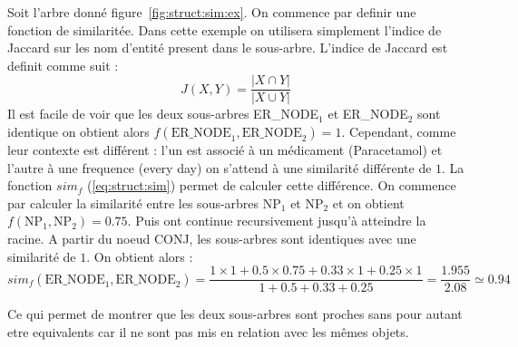 \begin{example}
    Soit l'arbre donné figure~\ref{fig:struct:sim:ex}.
    On commence par definir une fonction de similaritée.
    Dans cette exemple on utilisera simplement l'indice de Jaccard \cite{jaccardDistributionFloreAlpine1901} sur les nom d'entité present dans le sous-arbre.
    L'indice de Jaccard est definit comme suit :
    \[
        J(X, Y) = \frac{\lvert X \cap Y \rvert}{\lvert X \cup Y \rvert}
    \]
    Il est facile de voir que les deux sous-arbres ER\_NODE$_1$ et ER\_NODE$_2$ sont identique on obtient alors $f(\text{ER\_NODE}_1, \text{ER\_NODE}_2) = 1$.
    Cependant, comme leur contexte est différent : l'un est associé à un médicament (Paracetamol) et l'autre à une frequence (every day) on s'attend à une similarité différente de $1$.
    La fonction $sim_f$ (\ref{eq:struct:sim}) permet de calculer cette différence.
    On commence par calculer la similarité entre les sous-arbres NP$_1$ et NP$_2$ et on obtient $f(\text{NP}_1, \text{NP}_2) = 0.75$.
    Puis ont continue recursivement jusqu'à atteindre la racine.
    A partir du noeud CONJ, les sous-arbres sont identiques avec une similarité de $1$.
    On obtient alors :
    \[
        sim_f(\text{ER\_NODE}_1, \text{ER\_NODE}_2) = \frac{1 \times 1 + 0.5 \times 0.75 + 0.33 \times 1 + 0.25 \times 1}{1 + 0.5 + 0.33 + 0.25} = \frac{1.955}{2.08} \simeq 0.94
    \]

    Ce qui permet de montrer que les deux sous-arbres sont proches sans pour autant etre equivalents car il ne sont pas mis en relation avec les mêmes objets.



\end{example}
